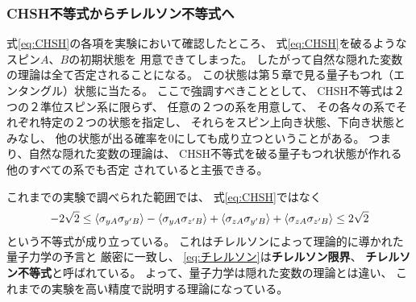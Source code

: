 \documentclass[a4paper, 10pt]{jsarticle}
\begin{document}
\subsubsection{CHSH不等式からチレルソン不等式へ}
式\eqref{eq:CHSH}の各項を実験において確認したところ、
式\eqref{eq:CHSH}を破るようなスピン$A$、$B$の初期状態を
用意できてしまった。
したがって自然な隠れた変数の理論は全て否定されることになる。
この状態は第５章で見る量子もつれ（エンタングル）状態に当たる。
ここで強調すべきこととして、
CHSH不等式は２つの２準位スピン系に限らず、
任意の２つの系を用意して、
その各々の系でそれぞれ特定の２つの状態を指定し、
それらをスピン上向き状態、下向き状態とみなし、
他の状態が出る確率を0にしても成り立つということがある。
つまり、自然な隠れた変数の理論は、
CHSH不等式を破る量子もつれ状態が作れる他のすべての系でも否定
されていると主張できる。

これまでの実験で調べられた範囲では、
式\eqref{eq:CHSH}ではなく
\begin{align}
	-2\sqrt{2} \leq
	\Braket{\sigma_{yA} \sigma_{y'B}}
- \Braket{\sigma_{yA} \sigma_{z'B}}
+ \Braket{\sigma_{zA} \sigma_{y'B}}
+ \Braket{\sigma_{zA} \sigma_{z'B}}
\leq 2\sqrt{2}
\label{eq:チレルソン}
\end{align}
という不等式が成り立っている。
これはチレルソンによって理論的に導かれた量子力学の予言と
厳密に一致し、
\eqref{eq:チレルソン}は\textbf{チレルソン限界}、
\textbf{チレルソン不等式}と呼ばれている。
よって、量子力学は隠れた変数の理論とは違い、
これまでの実験を高い精度で説明する理論になっている。

\vspace{2zw}

\begin{center}
	\textcolor{blue}{}
\end{center}
\end{document}
